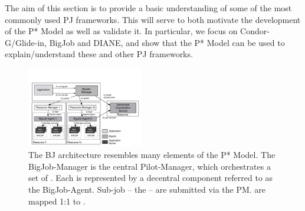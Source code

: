 \documentclass[conference]{IEEEtran}
\begin{document}

The aim of this section is to provide a basic understanding of some of
the most commonly used PJ frameworks. This will serve to both
motivate the development of the P* Model as well as validate it.  In
particular, we focus on Condor-G/Glide-in, BigJob and DIANE, and show
that the P* Model can be used to explain/understand these and
other PJ frameworks.



\begin{figure}[t]
	\up\up\up
	\centering
	\includegraphics[width=0.45\textwidth]{../figures/re_bigjob_interactions.pdf}
	\caption{ The
          BJ architecture resembles many elements of the P* Model. The
          BigJob-Manager is the central Pilot-Manager, which
          orchestrates a set of \pilots. Each \pilot is represented by a
          decentral component referred to as the BigJob-Agent. Sub-job
          -- the \cus -- are submitted via the PM. \cus are mapped 1:1
          to \sus.\up\up}
	\label{fig:figures_re_bigjob_interactions}
\end{figure}
\end{document}
